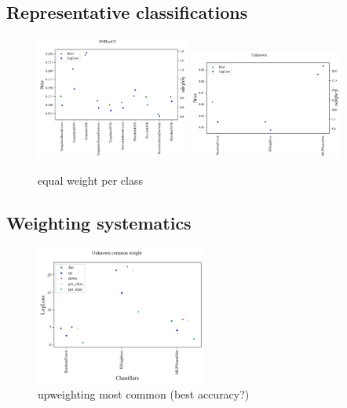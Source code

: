 \subsection{Representative classifications}
\label{sec:realresults}

\begin{figure}
	\begin{center}
		\includegraphics[width=0.45\textwidth]{./fig/SNPhotCC_res.png}
		\includegraphics[width=0.45\textwidth]{./fig/Unknown_res.png}
		\caption{equal weight per class}
		\label{fig:real_metric_compare}
	\end{center}
\end{figure}

\subsection{Weighting systematics}
\label{sec:weight_res}

\begin{figure}
	\begin{center}
		\includegraphics[width=0.5\textwidth]{./fig/systematic_Unknown_common.png}
		\caption{upweighting most common (best accuracy?)}
		\label{fig:systematic_common}
	\end{center}
\end{figure}

